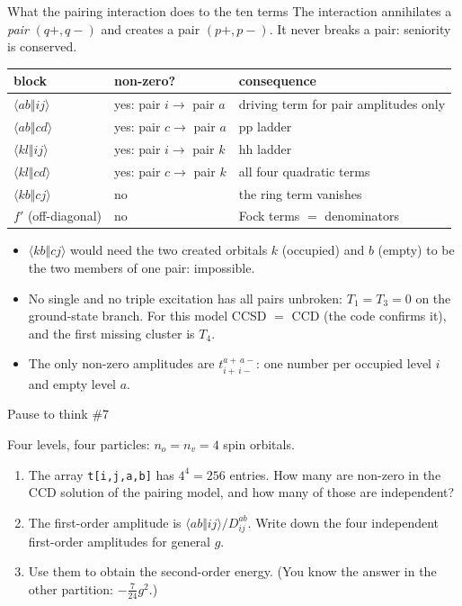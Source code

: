 \documentclass[aspectratio=169,10pt]{beamer}
\newcounter{thinkctr}
\newcommand{\thinkq}[2]{%
  \stepcounter{thinkctr}%
  \vfill
  \begin{tcolorbox}[enhanced,colback=palewarm,colframe=warm,boxrule=1.2pt,arc=4pt,
    grow to left by=6mm,grow to right by=6mm,
    left=16pt,right=16pt,top=16pt,bottom=18pt,
    fonttitle=\bfseries\Large,fontupper=\Large,
    title={Pause to think \#\thethinkctr\hfill\mdseries\normalsize(about #1 min -- discuss with your neighbour)}]
  #2
  \end{tcolorbox}
  \vfill}
\newcommand{\as}[4]{\langle #1#2\Vert #3#4\rangle}
\begin{document}
\begin{frame}[shrink=3]{What the pairing interaction does to the ten terms}
\small
The interaction annihilates a \emph{pair} $(q{+},q{-})$ and creates a pair $(p{+},p{-})$. It never breaks a pair: seniority is conserved.
\begin{center}
\renewcommand{\arraystretch}{1.25}
\begin{tabular}{lll}
\toprule
block & non-zero? & consequence\\
\midrule
$\as abij$ & yes: pair $i\to$ pair $a$ & driving term for pair amplitudes only\\
$\as abcd$ & yes: pair $c\to$ pair $a$ & pp ladder\\
$\as klij$ & yes: pair $i\to$ pair $k$ & hh ladder\\
$\as klcd$ & yes: pair $c\to$ pair $k$ & all four quadratic terms\\
$\as kbcj$ & \alert{no} & \alert{the ring term vanishes}\\
$f'$ (off-diagonal) & no & Fock terms $=$ denominators\\
\bottomrule
\end{tabular}
\end{center}
\begin{itemize}
\item $\as kbcj$ would need the two created orbitals $k$ (occupied) and $b$ (empty) to be the two members of one pair: impossible.
\item No single and no triple excitation has all pairs unbroken: $T_1=T_3=0$ on the ground-state branch. For this model CCSD $=$ CCD (the code confirms it), and the first missing cluster is $T_4$.
\item The only non-zero amplitudes are $t_{i+\,i-}^{a+\,a-}$: one number per occupied level $i$ and empty level $a$.
\end{itemize}
\end{frame}

\begin{frame}{Pause to think \#7}
\thinkq{3}{Four levels, four particles: $n_o=n_v=4$ spin orbitals.
\begin{enumerate}
\item The array \texttt{t[i,j,a,b]} has $4^4=256$ entries. How many are non-zero in the CCD solution of the pairing model, and how many of those are independent?
\item The first-order amplitude is $\as abij/D_{ij}^{ab}$. Write down the four independent first-order amplitudes for general $g$.
\item Use them to obtain the second-order energy. (You know the answer in the other partition: $-\tfrac{7}{24}g^2$.)
\end{enumerate}}
\end{frame}
\end{document}
